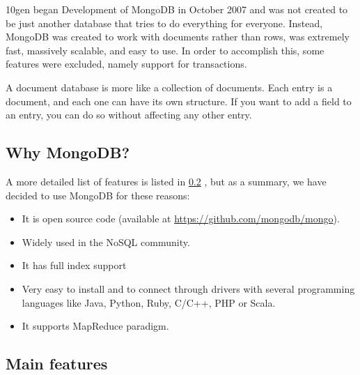 10gen began Development of MongoDB in October 2007 and was not created to be just another database that tries to do everything for everyone. Instead, MongoDB was created to work with documents rather than rows, was extremely fast, massively scalable, and easy to use. In order to accomplish this, some features were excluded, namely support for transactions. \newline

A document database is more like a collection of documents. Each entry is a document, and each one can have its own structure. If you want to add a field to an entry, you can do so without affecting any other entry.



\subsection{Why MongoDB?}

A more detailed list of features is listed in \ref{features_mongo} , but as a summary, we have decided to use MongoDB for these reasons:

\begin{itemize}
\item It is open source code (available at \url{https://github.com/mongodb/mongo}).
\item Widely used in the NoSQL community.
\item It has full index support
\item Very easy to install and to connect through drivers with several programming languages like Java, Python, Ruby, C/C++, PHP or Scala.
\item It supports MapReduce paradigm.
\end{itemize}

\subsection{Main features} \label{features_mongo}

